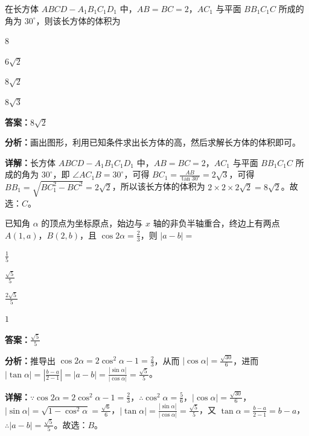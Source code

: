 \begin{question}[points=5]
在长方体 $ABCD-A_1B_1C_1D_1$ 中，$AB=BC=2$，$AC_1$ 与平面 $BB_1C_1C$ 所成的角为 $30^\circ$，则该长方体的体积为
\begin{choices}
  \item $8$
  \item $6\sqrt{2}$
  \item $8\sqrt{2}$
  \item $8\sqrt{3}$
\end{choices}
\begin{solution}
\textbf{答案：}$8\sqrt{2}$

\textbf{分析：}画出图形，利用已知条件求出长方体的高，然后求解长方体的体积即可。

\textbf{详解：}长方体 $ABCD-A_1B_1C_1D_1$ 中，$AB=BC=2$，$AC_1$ 与平面 $BB_1C_1C$ 所成的角为 $30^\circ$，即 $\angle AC_1B=30^\circ$，可得 $BC_1=\frac{AB}{\tan30^\circ}=2\sqrt{3}$，可得 $BB_1=\sqrt{BC_1^2-BC^2}=2\sqrt{2}$，所以该长方体的体积为 $2\times2\times2\sqrt{2}=8\sqrt{2}$。故选：$C$。
\end{solution}
\end{question}

\begin{question}[points=5]
已知角 $\alpha$ 的顶点为坐标原点，始边与 $x$ 轴的非负半轴重合，终边上有两点 $A(1,a)$，$B(2,b)$，且 $\cos2\alpha=\frac{2}{3}$，则 $|a-b|=$
\begin{choices}
  \item $\frac{1}{5}$
  \item $\frac{\sqrt{5}}{5}$
  \item $\frac{2\sqrt{5}}{5}$
  \item $1$
\end{choices}
\begin{solution}
\textbf{答案：}$\frac{\sqrt{5}}{5}$

\textbf{分析：}推导出 $\cos2\alpha=2\cos^2\alpha-1=\frac{2}{3}$，从而 $|\cos\alpha|=\frac{\sqrt{30}}{6}$，进而 $|\tan\alpha|=|\frac{b-a}{2-1}|=|a-b|=\frac{|\sin\alpha|}{|\cos\alpha|}=\frac{\sqrt{5}}{5}$。

\textbf{详解：}$\because \cos2\alpha=2\cos^2\alpha-1=\frac{2}{3}$，$\therefore \cos^2\alpha=\frac{5}{6}$，$|\cos\alpha|=\frac{\sqrt{30}}{6}$，$|\sin\alpha|=\sqrt{1-\cos^2\alpha}=\frac{\sqrt{6}}{6}$，$|\tan\alpha|=\frac{|\sin\alpha|}{|\cos\alpha|}=\frac{\sqrt{5}}{5}$，又 $\tan\alpha=\frac{b-a}{2-1}=b-a$，$\therefore |a-b|=\frac{\sqrt{5}}{5}$。故选：$B$。
\end{solution}
\end{question}

